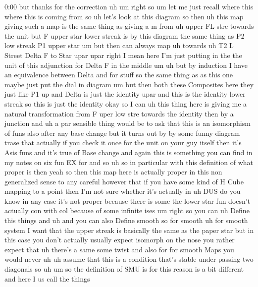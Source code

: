 \begin{unfinished}{0:00}
but  thanks  for  the  correction
uh
um  right  so  um  let  me  just  recall  where
this  where  this  is  coming
from  so
uh  let's  look  at  this  diagram  so
then  uh  this  map  giving  such  a  map  is
the  same  thing  as  giving  a  m
from
uh  upper  FL  stre  towards  the  unit  but  F
upper  star  lower  streak  is  by  this
diagram  the  same  thing  as  P2  low  streak
P1  upper
star
um  but  then  can  always
map  uh  towards  uh  T2  L  Street  Delta  F  to
Star
upar
upar  right  I  mean  here  I'm  just  putting
in  the  the  unit  of  this  adjunction  for
Delta  F  in  the  middle
um  uh
but  by  induction  I  have  an  equivalence
between  Delta  and  for  stuff  so  the  same
thing
as  as  this  one  maybe  just  put  the  dial
in
diagram
um  but  then  both  these  Composites  here
they  just  like  P1  up  and  Delta  is  just
the  identity  upar  and  this  is  the
identity  lower  streak  so  this  is  just
the
identity  okay  so  I
can  uh  this  thing  here  is  giving  me  a
natural  transformation  from  F  uper  low
stre  towards  the  identity  then  by  a
junction  and
uh  a  par  sensible  thing  would  be  to  ask
that  this  is  an  isomorphism  of  funs  also
after  any  base
change  but  it  turns  out  by  by  some  funny
diagram  trase  that  actually  if  you  check
it  once  for  the  unit  on  your  guy
itself  then  it's  Asis  funs  and  it's  true
of  Base  change  and  again  this  is
something  you  can  find  in  my  notes  on
six
fun
EX
for
and  so  uh  so  in  particular  with  this
definition  of  what  proper  is  then  yeah
so  then  this  map  here  is  actually
proper  in  this  non  generalized  sense  to
any  careful  however  that  if  you  have
some  kind  of  H  Cube  mapping  to  a  point
then  I'm  not  sure  whether  it's  actually
in
uh  DUS  do  you  know  in  any  case  it's  not
proper  because  there  is  some  the  lower
star  fun  doesn't  actually  con  with  col
because  of  some  infinite
ises
um  right  so  you  can  uh  Define  this
things  and  uh  and  you  can  also  Define
smooth
so  for  smooth  uh  for  smooth  system  I
want  that  the  upper  streak  is  basically
the  same  as  the  paper  star  but  in  this
case  you  don't  actually  usually  expect
isomorph  on  the  nose  you  rather  expect
that  uh  there's  a  same  some  twist  and
also  for  for  smooth  Maps  you  would  never
uh  uh  assume  that  this  is  a  condition
that's  stable  under  passing  two
diagonals
so
uh  um  so  the  definition  of  SMU  is  for
this  reason  is  a  bit
different
and  here  I  us  call  the  things

\end{unfinished}
